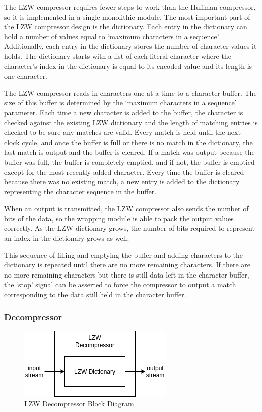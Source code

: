 \documentclass[doublespace,nopageskip]{VTthesis}
\begin{document}
The LZW compressor requires fewer steps to work than the Huffman compressor, so it is implemented in a single monolithic module. The most important part of the LZW compressor design is the dictionary. Each entry in the dictionary can hold a number of values equal to `maximum characters in a sequence' Additionally, each entry in the dictionary stores the number of character values it holds. The dictionary starts with a list of each literal character where the character's index in the dictionary is equal to its encoded value and its length is one character.

The LZW compressor reads in characters one-at-a-time to a character buffer. The size of this buffer is determined by the `maximum characters in a sequence' parameter. Each time a new character is added to the buffer, the character is checked against the existing LZW dictionary and the length of matching entries is checked to be sure any matches are valid. Every match is held until the next clock cycle, and once the buffer is full or there is no match in the dictionary, the last match is output and the buffer is cleared. If a match was output because the buffer was full, the buffer is completely emptied, and if not, the buffer is emptied except for the most recently added character. Every time the buffer is cleared because there was no existing match, a new entry is added to the dictionary representing the character sequence in the buffer.

When an output is transmitted, the LZW compressor also sends the number of bits of the data, so the wrapping module is able to pack the output values correctly. As the LZW dictionary grows, the number of bits required to represent an index in the dictionary grows as well.

This sequence of filling and emptying the buffer and adding characters to the dictionary is repeated until there are no more remaining characters. If there are no more remaining characters but there is still data left in the character buffer, the `stop' signal can be asserted to force the compressor to output a match corresponding to the data still held in the character buffer.

\subsubsection{Decompressor}\label{sss:lzw_decompressor_implementation}

\begin{figure}[htb]
	\centering
	\includegraphics[scale=1]{LZW Decompressor.png}
	\caption{LZW Decompressor Block Diagram}
	\label{fig:lzw_decompressor_block_diagram}
\end{figure}
\end{document}
